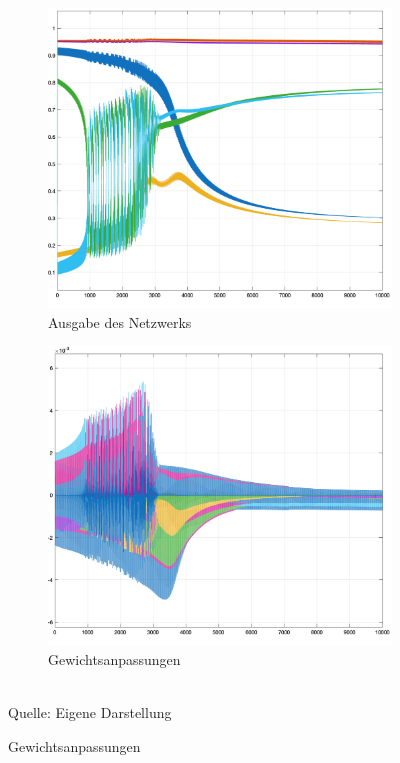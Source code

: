\begin{figure}[h]
  \label{fig:C-EP Sim 3}
  \caption{Simulationen des \ac{c-ep} mit 6 Neuronen}
  \centering
  \begin{subfigure}[b]{0.5\textwidth}
    \includegraphics[width=\textwidth]{abbildungen/c_ep_sim_3_ausgabe.png}
    \caption{Ausgabe des Netzwerks}
  \end{subfigure}%
  \hfill
  \begin{subfigure}[b]{0.5\textwidth}
    \includegraphics[width=\textwidth]{abbildungen/c_ep_sim_3_weight_update.png}
    \caption{Gewichtsanpassungen}
  \end{subfigure}
  \\
  Quelle: Eigene Darstellung
\end{figure}
